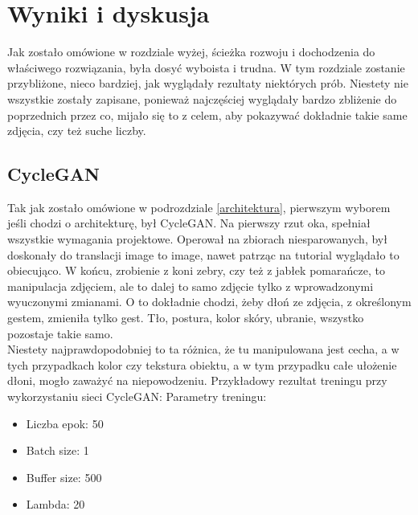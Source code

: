 \documentclass[12pt]{article}
\begin{document}
\begin{sloppypar}
\section{Wyniki i dyskusja}
{
  Jak zostało omówione w rozdziale wyżej, ścieżka rozwoju i dochodzenia do właściwego rozwiązania, była dosyć wyboista i trudna. 
  W tym rozdziale zostanie przybliżone, nieco bardziej, jak wyglądały rezultaty niektórych prób. 
  Niestety nie wszystkie zostały zapisane, ponieważ najczęściej wyglądały bardzo zbliżenie do poprzednich przez co, mijało się to z celem, aby pokazywać dokładnie takie same zdjęcia, czy też suche liczby.
  \subsection{CycleGAN}
  {
    Tak jak zostało omówione w podrozdziale \ref{architektura}, pierwszym wyborem jeśli chodzi o architekturę, był CycleGAN. 
    Na pierwszy rzut oka, spełniał wszystkie wymagania projektowe. 
    Operował na zbiorach niesparowanych, był doskonały do translacji image to image, nawet patrząc na tutorial \cite{cyclegan-tf} wyglądało to obiecująco. 
    W końcu, zrobienie z koni zebry, czy też z jabłek pomarańcze, to manipulacja zdjęciem, ale to dalej to samo zdjęcie tylko z wprowadzonymi wyuczonymi zmianami. 
    O to dokładnie chodzi, żeby dłoń ze zdjęcia, z określonym gestem, zmieniła tylko gest. Tło, postura, kolor skóry, ubranie, wszystko pozostaje takie samo. \\
    Niestety najprawdopodobniej to ta różnica, że tu manipulowana jest cecha, a w tych przypadkach kolor czy tekstura obiektu, a w tym przypadku całe ułożenie dłoni, mogło zaważyć na niepowodzeniu. 
    Przykładowy rezultat treningu przy wykorzystaniu sieci CycleGAN:
    Parametry treningu:
    \begin{itemize}
      \item Liczba epok: 50
      \item Batch size: 1
      \item Buffer size: 500
      \item Lambda: 20
    \end{itemize}

}}
\end{sloppypar}
\end{document}
